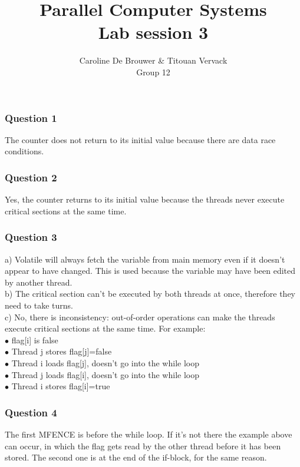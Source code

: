 \documentclass[12pt,a4paper,oneside]{article}
\begin{document}
  \title{Parallel Computer Systems \\ Lab session 3}
  \author{Caroline De Brouwer \& Titouan Vervack \\ Group 12}
  \date{}
  \maketitle
  
\subsubsection*{Question 1}
The counter does not return to its initial value because there are data race conditions.

\subsubsection*{Question 2}
Yes, the counter returns to its initial value because the threads never execute critical sections at the same time.

\subsubsection*{Question 3}
a) Volatile will always fetch the variable from main memory even if it doesn't appear to have changed. This is used because the variable may have been edited by another thread.\\
b) The critical section can't be executed by both threads at once, therefore they need to take turns.\\
c) No, there is inconsistency: out-of-order operations can make the threads execute critical sections at the same time. For example:\\
$\bullet$ flag[i] is false\\
$\bullet$ Thread j stores flag[j]=false\\
$\bullet$ Thread i loads flag[j], doesn't go into the while loop\\
$\bullet$ Thread j loads flag[i], doesn't go into the while loop\\
$\bullet$ Thread i stores flag[i]=true\\

\subsubsection*{Question 4}
The first MFENCE is before the while loop. If it's not there the example above can occur, in which the flag gets read by the other thread before it has been stored. The second one is at the end of the if-block, for the same reason.
\end{document}
